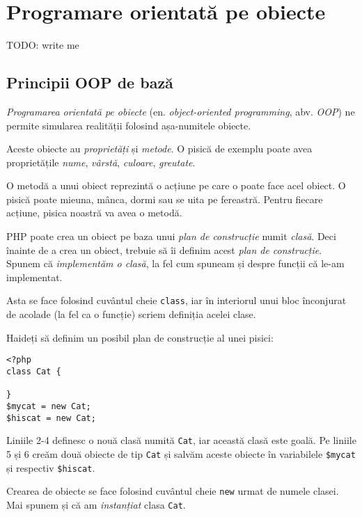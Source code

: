 \chapter{Programare orientată pe obiecte}

\begin{chapsummary}
TODO: write me
\end{chapsummary}

\section{Principii OOP de bază}
\textsl{Programarea orientată pe obiecte} (en. \textsl{object-oriented programming}, abv. \textsl{OOP})
ne permite simularea realității folosind așa-numitele obiecte.

Aceste obiecte au \textsl{proprietăți} și \textsl{metode}. O pisică de exemplu poate avea
proprietățile \textit{nume}, \textit{vârstă}, \textit{culoare}, \textit{greutate}.

O metodă a unui obiect reprezintă o acțiune pe care o poate face acel obiect. O pisică
poate mieuna, mânca, dormi sau se uita pe fereastră. Pentru fiecare acțiune,
pisica noastră va avea o metodă.

PHP poate crea un obiect pe baza unui \textit{plan de construcție} numit \textsl{clasă}.
Deci înainte de a crea un obiect, trebuie să îi definim acest \textit{plan de construcție}.
Spunem că \textit{implementăm o clasă}, la fel cum spuneam și despre funcții
că le-am implementat.

Asta se face folosind cuvântul cheie \texttt{class}, iar în interiorul unui bloc înconjurat
de acolade (la fel ca o funcție) scriem definiția acelei clase.

Haideți să definim un posibil plan de construcție al unei pisici:

\begin{lstlisting}[title=An empty class]
<?php
class Cat {

}
$mycat = new Cat;
$hiscat = new Cat;
\end{lstlisting}

Liniile 2-4 definesc o nouă clasă numită \texttt{Cat}, iar această clasă este goală.
Pe liniile 5 și 6 creăm două obiecte de tip \texttt{Cat} și salvăm aceste obiecte
în variabilele \texttt{\$mycat} și respectiv \texttt{\$hiscat}.

Crearea de obiecte se face folosind cuvântul cheie \texttt{new} urmat de numele clasei.
Mai spunem și că am \textsl{instanțiat} clasa \texttt{Cat}.

